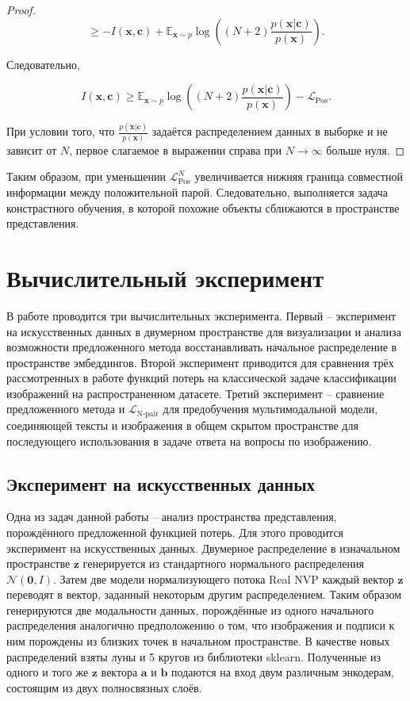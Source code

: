 \documentclass[a4paper, 14pt]{article}
\begin{document}
\begin{proof}
\[\geq - I(\mathbf{x}, \mathbf{c}) + \mathbb{E}_{\mathbf{x} \sim p}\log\left((N + 2)\frac{p(\mathbf{x}|\mathbf{c})}{p(\mathbf{x})}\right).\]

Следовательно,

\[I(\mathbf{x}, \mathbf{c}) \geq \mathbb{E}_{\mathbf{x} \sim p}\log\left((N + 2)\frac{p(\mathbf{x}|\mathbf{c})}{p(\mathbf{x})}\right) - \mathcal{L}_{\text{Pos}}.\]

При условии того, что $\frac{p(\mathbf{x}|\mathbf{c})}{p(\mathbf{x})}$ задаётся распределением данных в выборке и не зависит от $N$, первое слагаемое в выражении справа при $N \to \infty$ больше нуля.

\end{proof}

Таким образом, при уменьшении $\mathcal{L}_{\text{Pos}}^N$ увеличивается нижняя граница совместной информации между положительной парой. Следовательно, выполняется задача констрастного обучения, в которой похожие объекты  сближаются в пространстве представления.

\newpage
\section{Вычислительный эксперимент}

В работе проводится три вычислительных эксперимента. Первый -- эксперимент на искусственных данных в двумерном пространстве для визуализации и анализа возможности предложенного метода восстанавливать начальное распределение в пространстве эмбеддингов. Второй эксперимент приводится для сравнения трёх рассмотренных в работе функций потерь на классической задаче классификации изображений на распространенном датасете. Третий эксперимент -- сравнение предложенного метода и $\mathcal{L}_{\text{N-pair}}$ для предобучения мультимодальной модели, соединяющей тексты и изображения в общем скрытом пространстве для последующего использования в задаче ответа на вопросы по изображению.

\subsection{Эксперимент на искусственных данных}
Одна из задач данной работы -- анализ пространства представления, порождённого предложенной функцией потерь. Для этого проводится эксперимент на искусственных данных. Двумерное распределение в изначальном пространстве $\mathbf{z}$ генерируется из стандартного нормального распределения $\mathcal{N}(\mathbf{0}, I)$. Затем две модели нормализующего потока Real NVP \citep{RealNVP} каждый вектор $\mathbf{z}$ переводят в вектор, заданный некоторым другим распределением. Таким образом генерируются две модальности данных, порождённые из одного начального распределения аналогично предположению о том, что изображения и подписи к ним порождены из близких точек в начальном пространстве. В качестве новых распределений взяты луны и 5 кругов из библиотеки sklearn. Полученные из одного и того же $\mathbf{z}$ вектора $\mathbf{a}$ и $\mathbf{b}$ подаются на вход двум различным энкодерам, состоящим из двух полносвязных слоёв.
\end{document}
